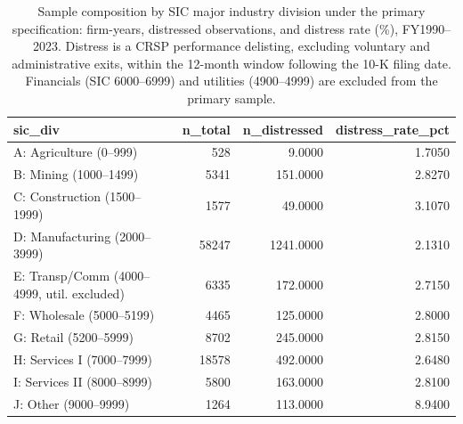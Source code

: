 \begin{table}[htbp]
\centering
\caption{Sample composition by SIC major industry division under the primary specification: firm-years, distressed observations, and distress rate (\%), FY1990--2023. Distress is a CRSP performance delisting, excluding voluntary and administrative exits, within the 12-month window following the 10-K filing date. Financials (SIC 6000--6999) and utilities (4900--4999) are excluded from the primary sample.}
\label{tab:sample_sic}
\footnotesize
\setlength{\tabcolsep}{4pt}
\begin{tabular}{lrrr}
\toprule
sic\_div & n\_total & n\_distressed & distress\_rate\_pct \\
\midrule
A: Agriculture (0–999) & 528 & 9.0000 & 1.7050 \\
B: Mining (1000–1499) & 5341 & 151.0000 & 2.8270 \\
C: Construction (1500–1999) & 1577 & 49.0000 & 3.1070 \\
D: Manufacturing (2000–3999) & 58247 & 1241.0000 & 2.1310 \\
E: Transp/Comm (4000–4999, util. excluded) & 6335 & 172.0000 & 2.7150 \\
F: Wholesale (5000–5199) & 4465 & 125.0000 & 2.8000 \\
G: Retail (5200–5999) & 8702 & 245.0000 & 2.8150 \\
H: Services I (7000–7999) & 18578 & 492.0000 & 2.6480 \\
I: Services II (8000–8999) & 5800 & 163.0000 & 2.8100 \\
J: Other (9000–9999) & 1264 & 113.0000 & 8.9400 \\
\bottomrule
\end{tabular}
\end{table}
